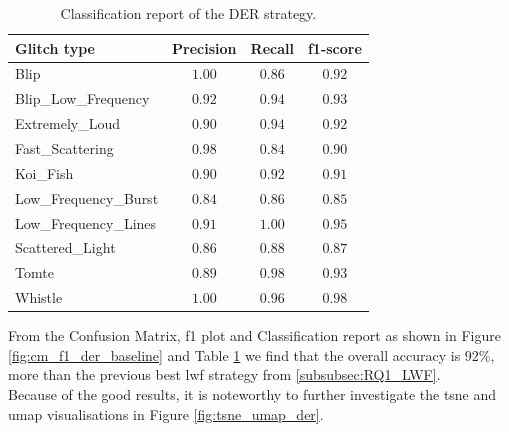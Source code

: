 \begin{table}[ht]
\centering
    \begin{tabular}{|l|c c c|}
    \hline
    \textbf{Glitch type} & \textbf{Precision} & \textbf{Recall} & \textbf{f1-score} \\ \hline
    Blip & $1.00$ & $0.86$ & $0.92$ \\
    Blip\_Low\_Frequency & $0.92$ & $0.94$ & $0.93$\\
    Extremely\_Loud & $0.90$ & $0.94$ &  $0.92$\\
    Fast\_Scattering & $0.98$ & $0.84$ &  $0.90$\\
    Koi\_Fish & $0.90$ & $0.92$ & $0.91$\\
    Low\_Frequency\_Burst & $0.84$ & $0.86$ & $0.85$\\
    Low\_Frequency\_Lines & $0.91$ & $1.00$ & $0.95$\\
    Scattered\_Light & $0.86$ & $0.88$ &$0.87$ \\
    Tomte & $0.89$ & $0.98$ & $0.93$ \\
    Whistle & $1.00$ & $0.96$ & $0.98$ \\
    \hline
    \end{tabular}
    \caption{Classification report of the DER strategy.}
    \label{tbl:RQ1_class_report_der}
\end{table}

From the Confusion Matrix, f1 plot and Classification report as shown in Figure \ref{fig:cm_f1_der_baseline} and Table \ref{tbl:RQ1_class_report_der} we find that the overall accuracy is $92\%$, more than the previous best \acrshort{lwf} strategy from \ref{subsubsec:RQ1_LWF}.\\

Because of the good results, it is noteworthy to further investigate the \acrshort{tsne} and \acrshort{umap} visualisations in Figure \ref{fig:tsne_umap_der}. 


